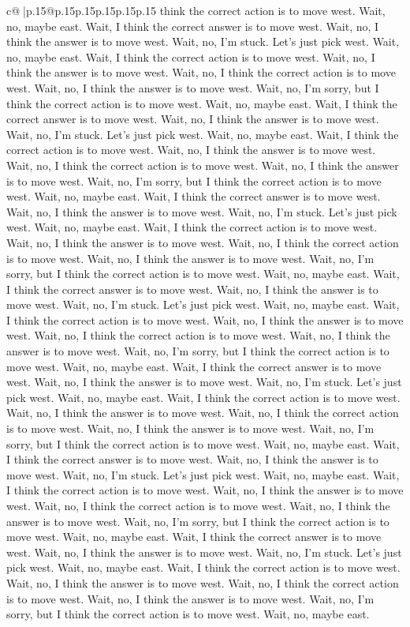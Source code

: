 \documentclass{article}
\begin{document}
{\begin{supertabular}{c@{$\;$}|p{.15\linewidth}@{}p{.15\linewidth}p{.15\linewidth}p{.15\linewidth}p{.15\linewidth}p{.15\linewidth}}
{{{think the correct action is to move west. Wait, no, maybe east. Wait, I think the correct answer is to move west. Wait, no, I think the answer is to move west. Wait, no, I'm stuck. Let's just pick west. Wait, no, maybe east. Wait, I think the correct action is to move west. Wait, no, I think the answer is to move west. Wait, no, I think the correct action is to move west. Wait, no, I think the answer is to move west. Wait, no, I'm sorry, but I think the correct action is to move west. Wait, no, maybe east. Wait, I think the correct answer is to move west. Wait, no, I think the answer is to move west. Wait, no, I'm stuck. Let's just pick west. Wait, no, maybe east. Wait, I think the correct action is to move west. Wait, no, I think the answer is to move west. Wait, no, I think the correct action is to move west. Wait, no, I think the answer is to move west. Wait, no, I'm sorry, but I think the correct action is to move west. Wait, no, maybe east. Wait, I think the correct answer is to move west. Wait, no, I think the answer is to move west. Wait, no, I'm stuck. Let's just pick west. Wait, no, maybe east. Wait, I think the correct action is to move west. Wait, no, I think the answer is to move west. Wait, no, I think the correct action is to move west. Wait, no, I think the answer is to move west. Wait, no, I'm sorry, but I think the correct action is to move west. Wait, no, maybe east. Wait, I think the correct answer is to move west. Wait, no, I think the answer is to move west. Wait, no, I'm stuck. Let's just pick west. Wait, no, maybe east. Wait, I think the correct action is to move west. Wait, no, I think the answer is to move west. Wait, no, I think the correct action is to move west. Wait, no, I think the answer is to move west. Wait, no, I'm sorry, but I think the correct action is to move west. Wait, no, maybe east. Wait, I think the correct answer is to move west. Wait, no, I think the answer is to move west. Wait, no, I'm stuck. Let's just pick west. Wait, no, maybe east. Wait, I think the correct action is to move west. Wait, no, I think the answer is to move west. Wait, no, I think the correct action is to move west. Wait, no, I think the answer is to move west. Wait, no, I'm sorry, but I think the correct action is to move west. Wait, no, maybe east. Wait, I think the correct answer is to move west. Wait, no, I think the answer is to move west. Wait, no, I'm stuck. Let's just pick west. Wait, no, maybe east. Wait, I think the correct action is to move west. Wait, no, I think the answer is to move west. Wait, no, I think the correct action is to move west. Wait, no, I think the answer is to move west. Wait, no, I'm sorry, but I think the correct action is to move west. Wait, no, maybe east. Wait, I think the correct answer is to move west. Wait, no, I think the answer is to move west. Wait, no, I'm stuck. Let's just pick west. Wait, no, maybe east. Wait, I think the correct action is to move west. Wait, no, I think the answer is to move west. Wait, no, I think the correct action is to move west. Wait, no, I think the answer is to move west. Wait, no, I'm sorry, but I think the correct action is to move west. Wait, no, maybe east. }}}
\end{supertabular}}
\end{document}
